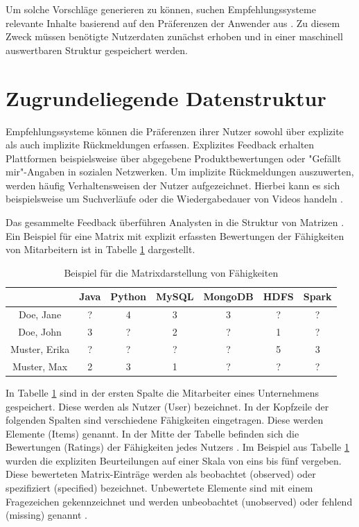 Um solche Vorschläge generieren zu können, suchen Empfehlungssysteme relevante Inhalte basierend auf den Präferenzen der Anwender aus \cite[S. 1]{das:2017}. Zu diesem Zweck müssen benötigte Nutzerdaten zunächst erhoben und in einer maschinell auswertbaren Struktur gespeichert werden.

\section{Zugrundeliegende Datenstruktur}
\label{ch:empfehlungssysteme:arbeitsweise}
Empfehlungssysteme können die Präferenzen ihrer Nutzer sowohl über explizite als auch implizite Rückmeldungen erfassen. Explizites Feedback erhalten Plattformen beispielsweise über abgegebene Produktbewertungen oder "Gefällt mir"-Angaben in sozialen Netzwerken. Um implizite Rückmeldungen auszuwerten, werden häufig Verhaltensweisen der Nutzer aufgezeichnet. Hierbei kann es sich beispielsweise um Suchverläufe oder die Wiedergabedauer von Videos handeln \cite[S. 3]{pu:2012}.

Das gesammelte Feedback überführen Analysten in die Struktur von Matrizen \cite[S. 11f.]{recommenderSystems:2016}. Ein Beispiel für eine Matrix mit explizit erfassten Bewertungen der Fähigkeiten von Mitarbeitern ist in Tabelle \ref{tbl:empfehlungssysteme:arbeitsweise:tbl1} dargestellt.

\begin{table}[h]
	\centering
	\begin{tabular}{c|c|c|c|c|c|c}
	 & Java & Python & MySQL & MongoDB & HDFS & Spark\\ 
	\hline
	Doe, Jane & ? & 4 & 3 & 3 & ? & ?\\
	Doe, John & 3 & ? & 2 & ? & 1 & ?\\
	Muster, Erika & ? & ? & ? & ? & 5 & 3\\
	Muster, Max & 2 & 3 & 1 & ? & ? & ?
	\end{tabular}
	\caption{Beispiel für die Matrixdarstellung von Fähigkeiten}
	\label{tbl:empfehlungssysteme:arbeitsweise:tbl1}
\end{table}

In Tabelle \ref{tbl:empfehlungssysteme:arbeitsweise:tbl1} sind in der ersten Spalte die Mitarbeiter eines Unternehmens gespeichert. Diese werden als Nutzer (User) bezeichnet. In der Kopfzeile der folgenden Spalten sind verschiedene Fähigkeiten eingetragen. Diese werden Elemente (Items) genannt. In der Mitte der Tabelle befinden sich die Bewertungen (Ratings) der Fähigkeiten jedes Nutzers \cite[S. 1f.]{strub:2016}. Im Beispiel aus Tabelle \ref{tbl:empfehlungssysteme:arbeitsweise:tbl1} wurden die expliziten Beurteilungen auf einer Skala von eins bis fünf vergeben. Diese bewerteten Matrix-Einträge werden  als beobachtet (observed) oder spezifiziert (specified) bezeichnet. Unbewertete Elemente sind mit einem Fragezeichen gekennzeichnet und werden unbeobachtet (unobserved) oder fehlend (missing) genannt \cite[S. 8]{recommenderSystems:2016}.

